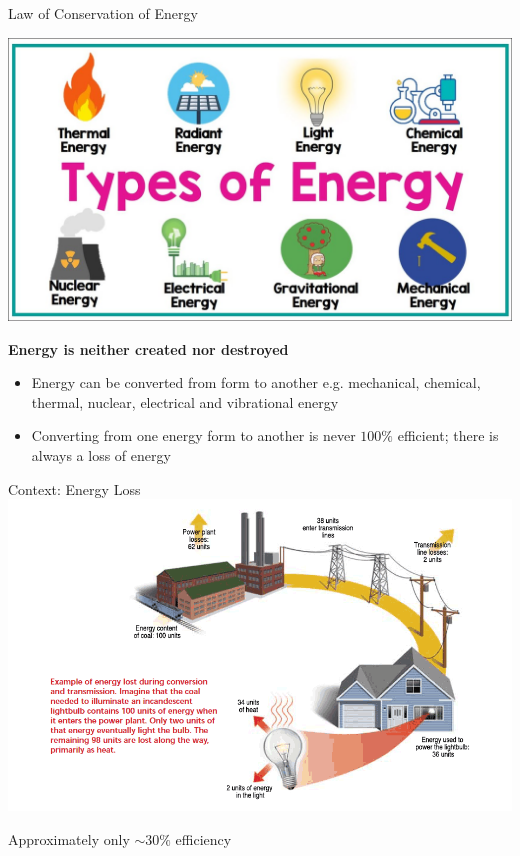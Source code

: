 \documentclass[11pt]{beamer}
\begin{document}
\begin{frame}{Law of Conservation of Energy}
  \begin{center}
    \includegraphics[scale=0.15]{energy_types}
    
    \textbf{Energy is neither created nor destroyed}
  \end{center}

  \begin{itemize}
  \item Energy can be converted from form to another
    e.g. mechanical, chemical, thermal, nuclear,
    electrical and vibrational energy
  \item Converting from one energy form to another is
    never $100\%$ efficient; there is always a loss of
    energy
  \end{itemize}
\end{frame}

\begin{frame}{Context: Energy Loss}
  \centering
  \includegraphics[width=0.9\linewidth]{energy_loss}

  Approximately only $\sim 30\%$ efficiency
\end{frame}
\end{document}
